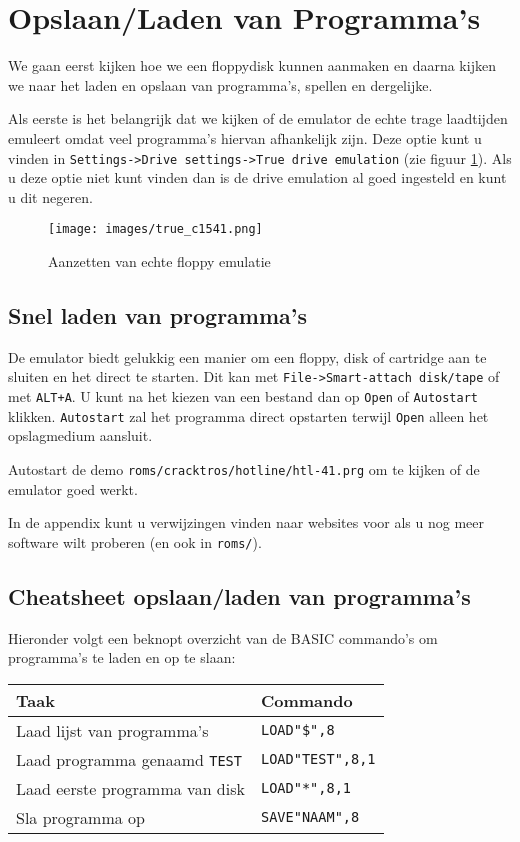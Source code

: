 \section{Opslaan/Laden van Programma's}

We gaan eerst kijken hoe we een floppydisk kunnen aanmaken en daarna kijken we naar het laden en opslaan van programma's, spellen en dergelijke.

Als eerste is het belangrijk dat we kijken of de emulator de echte trage laadtijden emuleert omdat veel programma's hiervan afhankelijk zijn.
Deze optie kunt u vinden in \verb:Settings->Drive settings->True drive emulation: (zie figuur \ref{fig:true_c1541}).
Als u deze optie niet kunt vinden dan is de drive emulation al goed ingesteld en kunt u dit negeren.

\begin{figure}
\centering
\texttt{[image: images/true\_c1541.png]}
\caption{Aanzetten van echte floppy emulatie}
\label{fig:true_c1541}
\end{figure}

\subsection{Snel laden van programma's}

De emulator biedt gelukkig een manier om een floppy, disk of cartridge aan te sluiten en het direct te starten.
Dit kan met \verb:File->Smart-attach disk/tape: of met \verb:ALT+A:.
U kunt na het kiezen van een bestand dan op \verb:Open: of \verb:Autostart: klikken.
\verb:Autostart: zal het programma direct opstarten terwijl \verb:Open: alleen het opslagmedium aansluit.

\problem Autostart de demo \verb:roms/cracktros/hotline/htl-41.prg: om te kijken of de emulator goed werkt.

In de appendix kunt u verwijzingen vinden naar websites voor als u nog meer software wilt proberen (en ook in \verb:roms/:).

\subsection{Cheatsheet opslaan/laden van programma's}

Hieronder volgt een beknopt overzicht van de BASIC commando's om programma's te laden en op te slaan:

\begin{tabular}{l|l}
Taak & Commando \\ \hline
Laad lijst van programma's & \verb:LOAD"$",8: \\
Laad programma genaamd \verb:TEST: & \verb:LOAD"TEST",8,1: \\
Laad eerste programma van disk & \verb:LOAD"*",8,1: \\
Sla programma op & \verb:SAVE"NAAM",8:
\end{tabular}

